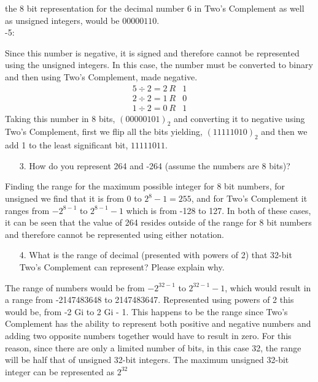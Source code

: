 \documentclass[12pt]{article}
\begin{document}
    the 8 bit representation for the decimal number 6 in Two's Complement as
    well as unsigned integers, would be $\boxed{00000110.}$ \\
    -5:
    \par Since this number is negative, it is signed and therefore cannot be
    represented using the unsigned integers. In this case, the number must be
    converted to binary and then using Two's Complement, made negative.
    \begin{align*}
        5 \div 2 = 2\ R&1 \\
        2 \div 2 = 1\ R&0 \\
        1 \div 2 = 0\ R&1
    \end{align*}
    Taking this number in 8 bits, $(00000101)_{2}$ and converting it to negative
    using Two's Complement, first we flip all the bits yielding,
    $(11111010)_{2}$ and then we add 1 to the least significant bit,
    $\boxed{11111011.}$
    \begin{itemize}
        \item[3.] How do you represent 264 and -264 (assume the numbers are 8
            bits)?
    \end{itemize}
    \par Finding the range for the maximum possible integer for 8 bit numbers,
    for unsigned we find that it is from 0 to $2^{8} - 1 = 255$, and for Two's
    Complement it ranges from $-2^{8-1}$ to $2^{8-1} - 1$ which is from -128 to
    127. In both of these cases, it can be seen that the value of 264 resides
    outside of the range for 8 bit numbers and therefore cannot be represented
    using either notation.
    \begin{itemize}
        \item[4.] What is the range of decimal (presented with powers of 2) that
            32-bit Two's Complement can represent? Please explain why.
    \end{itemize}
    \par The range of numbers would be from $-2^{32-1}$ to $2^{32-1}-1$, which
    would result in a range from -2147483648 to 2147483647. Represented using
    powers of 2 this would be, from -2 Gi to 2 Gi - 1.  This happens to be the
    range since Two's Complement has the ability to represent both positive and
    negative numbers and adding two opposite numbers together would have to
    result in zero. For this reason, since there are only a limited number of
    bits, in this case 32, the range will be half that of unsigned 32-bit
    integers. The maximum unsigned 32-bit integer can be represented as $2^{32}$
\end{document}
